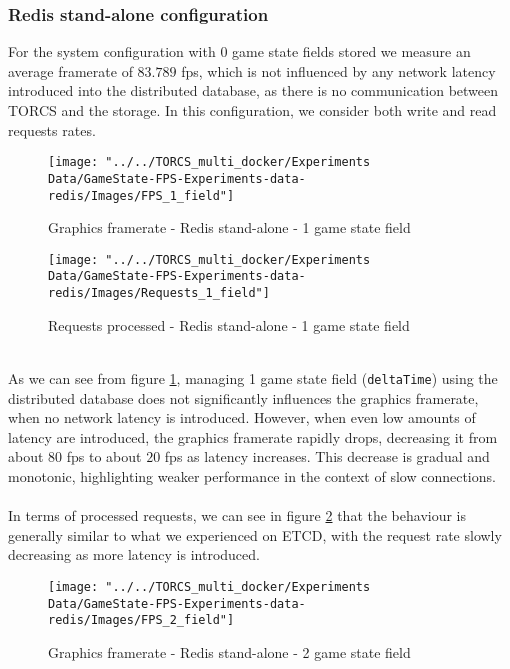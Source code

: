\subsubsection{Redis stand-alone configuration}
For the system configuration with 0 game state fields stored we measure an average framerate of $83.789$ fps, which is not influenced by any network latency introduced into the distributed database, as there is no communication between TORCS and the storage. In this configuration, we consider both write and read requests rates.
\begin{figure}[h!]
	\centering
	\texttt{[image: "../../TORCS\_multi\_docker/Experiments Data/GameState-FPS-Experiments-data-redis/Images/FPS\_1\_field"]}
	\caption[Graphics framerate - Redis stand-alone - 1 game state field]{Graphics framerate - Redis stand-alone - 1 game state field}
	\label{fig:fps-1-field-redis}
\end{figure}
\begin{figure}[h!]
	\centering
	\texttt{[image: "../../TORCS\_multi\_docker/Experiments Data/GameState-FPS-Experiments-data-redis/Images/Requests\_1\_field"]}
	\caption[Requests processed - Redis stand-alone - 1 game state field]{Requests processed - Redis stand-alone - 1 game state field}
	\label{fig:requests-1-field-redis}
\end{figure}
\\ As we can see from figure \ref{fig:fps-1-field-redis}, managing 1 game state field (\texttt{deltaTime}) using the distributed database does not significantly influences the graphics framerate, when no network latency is introduced. However, when even low amounts of latency are introduced, the graphics framerate rapidly drops, decreasing it from about $80$ fps to about $20$ fps as latency increases. This decrease is gradual and monotonic, highlighting weaker performance in the context of slow connections. \\ \\
In terms of processed requests, we can see in figure \ref{fig:requests-1-field-redis} that the behaviour is generally similar to what we experienced on ETCD, with the request rate slowly decreasing as more latency is introduced. \\
\begin{figure}[h!]
	\centering
	\texttt{[image: "../../TORCS\_multi\_docker/Experiments Data/GameState-FPS-Experiments-data-redis/Images/FPS\_2\_field"]}
	\caption[Graphics framerate - Redis stand-alone - 2 game state field]{Graphics framerate - Redis stand-alone - 2 game state field}
	\label{fig:fps-2-field-redis}
\end{figure}
